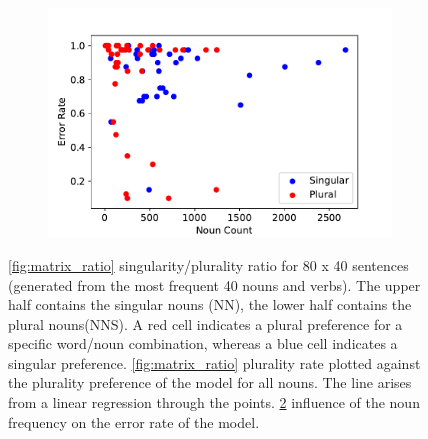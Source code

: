 \begin{figure}
\begin{subfigure}[b]{0.32\textwidth}
        \includegraphics[width=\textwidth]{noun_freq_error_rate.pdf}
        \label{fig:noun_freq_error}
    \end{subfigure}
    \caption{\ref{fig:matrix_ratio} singularity/plurality ratio for 80 x 40 sentences (generated from the most frequent 40 nouns and verbs). The upper half contains the singular nouns (NN), the lower half contains the plural nouns(NNS). A red cell indicates a plural preference for a specific word/noun combination, whereas a blue cell indicates a singular preference. \ref{fig:matrix_ratio} plurality rate plotted against the plurality preference of the model for all nouns. The line arises from a linear regression through the points. \ref{fig:noun_freq_error} influence of the noun frequency on the error rate of the model.}
\end{figure}

